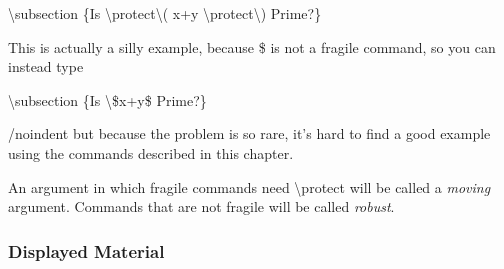 \documentclass[twocolumn]{article}        %
\begin{document}
\textbackslash subsection \{Is \textbackslash protect\textbackslash (  x+y   \textbackslash protect\textbackslash ) Prime?\}

This is actually a silly example, because \$ is not a fragile command, so you can instead type

\textbackslash subsection \{Is \textbackslash \$x+y\$ Prime?\}

/noindent
but because the problem is so rare, it's hard to find a good example using the commands described in this chapter.

An argument in which fragile commands need \textbackslash protect will be called a \emph{moving} argument.
Commands that are not fragile will be called \emph{robust}.

\subsubsection{Displayed Material}
\end{document}
